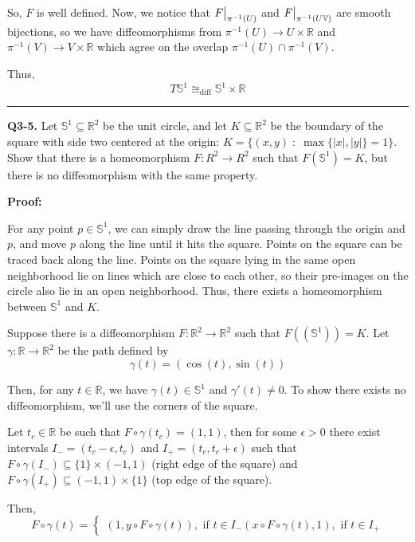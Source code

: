 \documentclass{article}
\newcommand{\R}{\mathbb{R}}
\newcommand{\V}{\mathbb{V}}
\newcommand{\restr}[2]{{%
  \left.\kern-\nulldelimiterspace %
  #1 %
  \vphantom{\big|} %
  \right|_{#2} %
  }}
\begin{document}
So, $F$ is well defined. Now, we notice that $\restr{F}{\pi^{-1}(U)}$ and $\restr{F}{\pi^{-1}(U\V)}$ are smooth bijections, so we have diffeomorphisms from $\pi^{-1}(U) \rightarrow U \times \R$ and $\pi^{-1}(V) \rightarrow V \times \R$ which agree on the overlap $\pi^{-1}(U) \cap \pi^{-1}(V)$.

Thus, 
\[ T\mathbb{S}^1 \cong_{\text{diff}} \mathbb{S}^1 \times \R \]

\vskip 0.5cm
\hrule 
\vskip 0.5cm

\textbf{Q3-5.} Let $\mathbb{S}^1 \subseteq \R^2$ be the unit circle, and let $K \subseteq \R^2$ be the boundary of the square with side two centered at the origin: $K = \{(x,y)\;:\;\max \{|x|, |y|\} = 1 \}$. Show that there is a homeomorphism $F : R^2 \rightarrow R^2$ such that $F \left( \mathbb{S}^1 \right) = K$, but there is no diffeomorphism with the same property.

\vskip 0.5cm
\textbf{Proof:}

\vskip 0.5cm
For any point $p \in \mathbb{S}^1$, we can simply draw the line passing through the origin and $p$, and move $p$ along the line until it hits the square. Points on the square can be traced back along the line. Points on the square lying in the same open neighborhood lie on lines which are close to each other, so their pre-images on the circle also lie in an open neighborhood. Thus, there exists a homeomorphism between $\mathbb{S}^1$ and $K$.  

\vskip 0.5cm
Suppose there is a diffeomorphism $F : \R^2 \rightarrow \R^2$ such that $F(\left( \mathbb{S}^1 \right)) = K$. Let $\gamma : \R \rightarrow \R^2$ be the path defined by 
\[ \gamma(t) = \left( \cos(t), \sin(t) \right) \]

Then, for any $t \in \R$, we have $\gamma(t) \in \mathbb{S}^1$ and $\gamma'(t) \neq 0$. To show there exists no diffeomorphism, we'll use the corners of the square. 

\vsize 0.5cm
Let $t_c \in \R$ be such that $F \circ \gamma(t_c) = (1,1)$, then for some $\epsilon > 0$ there exist intervals $I_- = (t_c - \epsilon, t_c)$ and $I_+ = (t_c, t_c + \epsilon)$ such that $F \circ \gamma(I_-) \subseteq \{1\} \times (-1, 1)$ (right edge of the square) and $F \circ \gamma(I_+) \subseteq (-1, 1) \times \{1\}$ (top edge of the square).

\vskip 0.5cm
Then, 
\[ F \circ \gamma(t) = \begin{cases}
  \left( 1, y \circ F \circ \gamma(t) \right), \text{  if } t \in I_-
  \left( x \circ F \circ \gamma(t), 1 \right), \text{  if } t \in I_+
\end{cases} \]
\end{document}
